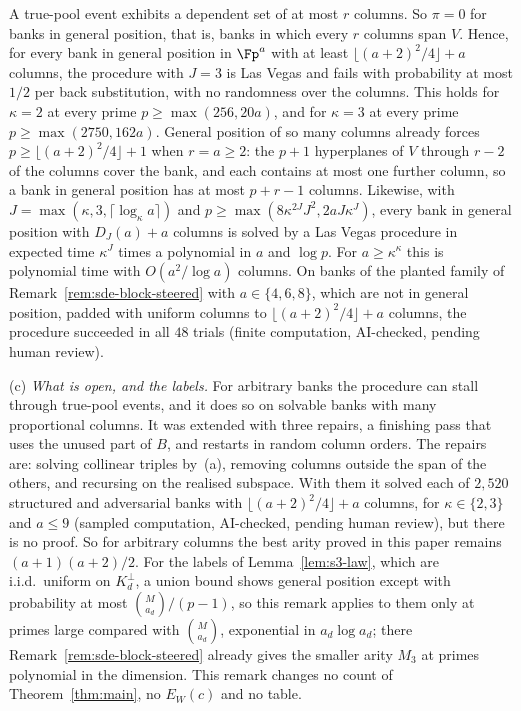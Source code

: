 \begin{remark}
A true-pool event exhibits a dependent set of at most $r$ columns. So $\pi=0$ for banks in general position, that is, banks in which every $r$ columns span $V$. Hence, for every bank in general position in $\Fp^a$ with at least $\lfloor(a+2)^2/4\rfloor+a$ columns, the procedure with $J=3$ is Las Vegas and fails with probability at most $1/2$ per back substitution, with no randomness over the columns. This holds for $\kappa=2$ at every prime $p\ge\max(256,20a)$, and for $\kappa=3$ at every prime $p\ge\max(2750,162a)$. General position of so many columns already forces $p\ge\lfloor(a+2)^2/4\rfloor+1$ when $r=a\ge2$: the $p+1$ hyperplanes of $V$ through $r-2$ of the columns cover the bank, and each contains at most one further column, so a bank in general position has at most $p+r-1$ columns. Likewise, with $J=\max(\kappa,3,\lceil\log_\kappa a\rceil)$ and $p\ge\max(8\kappa^{2J}J^2,2aJ\kappa^J)$, every bank in general position with $D_J(a)+a$ columns is solved by a Las Vegas procedure in expected time $\kappa^J$ times a polynomial in $a$ and $\log p$. For $a\ge\kappa^\kappa$ this is polynomial time with $O(a^2/\log a)$ columns. On banks of the planted family of Remark~\ref{rem:sde-block-steered} with $a\in\{4,6,8\}$, which are not in general position, padded with uniform columns to $\lfloor(a+2)^2/4\rfloor+a$ columns, the procedure succeeded in all $48$ trials (finite computation, AI-checked, pending human review).

\textup{(c)} \emph{What is open, and the labels.} For arbitrary banks the procedure can stall through true-pool events, and it does so on solvable banks with many proportional columns. It was extended with three repairs, a finishing pass that uses the unused part of $B$, and restarts in random column orders. The repairs are: solving collinear triples by~(a), removing columns outside the span of the others, and recursing on the realised subspace. With them it solved each of $2{,}520$ structured and adversarial banks with $\lfloor(a+2)^2/4\rfloor+a$ columns, for $\kappa\in\{2,3\}$ and $a\le9$ (sampled computation, AI-checked, pending human review), but there is no proof. So for arbitrary columns the best arity proved in this paper remains $(a+1)(a+2)/2$. For the labels of Lemma~\ref{lem:s3-law}, which are i.i.d.\ uniform on $K_d^\perp$, a union bound shows general position except with probability at most $\binom{M}{a_d}/(p-1)$, so this remark applies to them only at primes large compared with $\binom{M}{a_d}$, exponential in $a_d\log a_d$; there Remark~\ref{rem:sde-block-steered} already gives the smaller arity $M_3$ at primes polynomial in the dimension. This remark changes no count of Theorem~\ref{thm:main}, no $E_W(c)$ and no table.
\end{remark}

